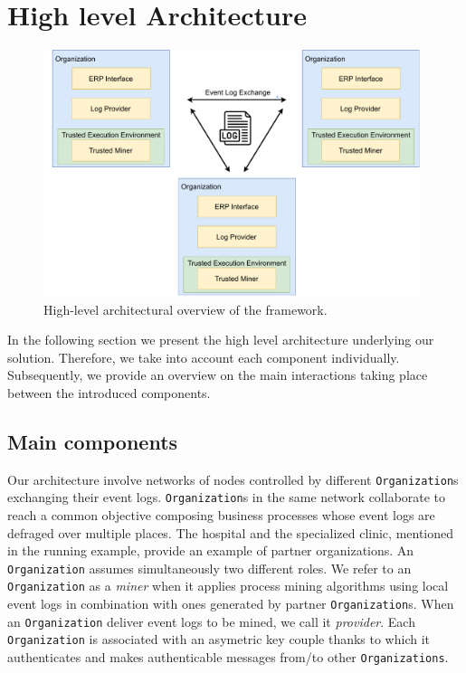 \section{High level Architecture}
\label{fig:architecture_diagram}
\begin{figure}[t]
\centering
\includegraphics[width=11cm]{content/figures/architecture_diagram.pdf}
\caption{High-level architectural overview of the framework.}
\label{fig:implementation}
\end{figure}
In the following section we present the high level architecture underlying our solution. Therefore, we take into account each component individually. Subsequently, we provide an overview on the main interactions taking place between the introduced components.
\subsection{Main components}
Our architecture involve networks of nodes controlled by different \texttt{Organization}s exchanging their event logs. \texttt{Organization}s in the same network collaborate to reach a common objective composing business processes whose event logs are defraged over multiple places. The hospital and the specialized clinic, mentioned in the running example, provide an example of partner organizations. An \texttt{Organization} assumes simultaneously two different roles. We refer to an \texttt{Organization} as a \textit{miner} when it applies process mining algorithms using local event logs in combination with ones generated by partner \texttt{Organization}s. When an \texttt{Organization} deliver event logs to be mined, we call it \textit{provider}. Each \texttt{Organization} is associated with an asymetric key couple thanks to which it authenticates and makes authenticable messages from/to other \texttt{Organizations}.

